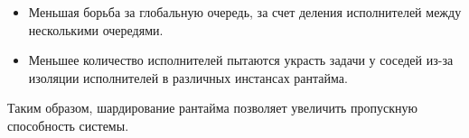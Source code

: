 \begin{itemize}
    \item Меньшая борьба за глобальную очередь, за счет деления исполнителей между несколькими очередями.
    \item Меньшее количество исполнителей пытаются украсть задачи у соседей из-за изоляции исполнителей в различных инстансах рантайма.
\end{itemize}

Таким образом, шардирование рантайма позволяет увеличить пропускную способность системы.
